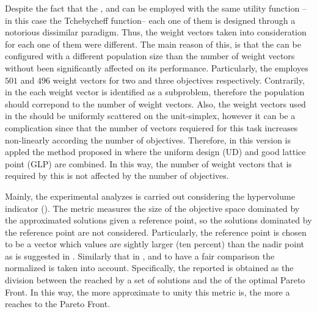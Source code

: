 Despite the fact that the \MOEAD{}, and \RMOEA{} can be employed with the same utility function --in this case the Tchebycheff function-- each one of them is designed through a notorious dissimilar paradigm.
%
Thus, the weight vectors taken into consideration for each one of them were different.%
%
The main reason of this, is that the \RMOEA{} can be configured with a different population size than the number of weight vectors without been significantly affected on its performance.
%
Particularly, the \RMOEA{} employes $501$ and $496$ weight vectors for two and three objectives respectively.
%
Contrarily, in the \MOEAD{} each weight vector is identified as a subproblem, therefore the population should correpond to the number of weight vectors.
%
Also, the weight vectors used in the \MOEAD{} should be uniformly scattered on the unit-simplex, however it can be a complication since that the number of vectors requiered for this task increases non-linearly according the number of objectives.
%
Therefore, in this version is appled the method proposed in \cite{Joel:MOEAD_Uniform_Design, Joel:Kuhn_Munkres} where the uniform design (UD) \cite{Joel:Uniform_Design} and good lattice point (GLP) are combined.
%
In this way, the number of weight vectors that is required by this \MOEA{} is not affected by the number of objectives.


Mainly, the experimental analyzes is carried out considering the hypervolume indicator (\HV{}).
%
The \HV{} metric measures the size of the objective space dominated by the approximated solutions given a reference point, so the solutions dominated by the reference point are not considered.
%
Particularly, the reference point is chosen to be a vector which values are sightly larger (ten percent) than the nadir point as is suggested in \cite{ishibuchi2017reference}.
%
Similarly that in \cite{li2015evolutionary}, and to have a fair comparison the normalized \HV{} is taken into account.
%
Specifically, the \HV{} reported is obtained as the division between the \HV{} reached by a set of solutions and the \HV{} of the optimal Pareto Front.
%
In this way, the more approximate to unity this metric is, the more a \MOEA{} reaches to the Pareto Front.
%



